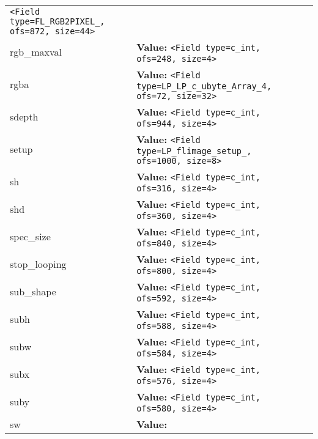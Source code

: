 \begin{longtable}{|p{\varnamewidth}|p{\vardescrwidth}|l}
{\tt {\textless}Field type=FL\_RGB2PIXEL\_, ofs=872, size=44{\textgreater}}&\\
\cline{1-2}
\raggedright r\-g\-b\-\_\-m\-a\-x\-v\-a\-l\- & \raggedright \textbf{Value:} 
{\tt {\textless}Field type=c\_int, ofs=248, size=4{\textgreater}}&\\
\cline{1-2}
\raggedright r\-g\-b\-a\- & \raggedright \textbf{Value:} 
{\tt {\textless}Field type=LP\_LP\_c\_ubyte\_Array\_4, ofs=72, size=32{\textgreater}}&\\
\cline{1-2}
\raggedright s\-d\-e\-p\-t\-h\- & \raggedright \textbf{Value:} 
{\tt {\textless}Field type=c\_int, ofs=944, size=4{\textgreater}}&\\
\cline{1-2}
\raggedright s\-e\-t\-u\-p\- & \raggedright \textbf{Value:} 
{\tt {\textless}Field type=LP\_flimage\_setup\_, ofs=1000, size=8{\textgreater}}&\\
\cline{1-2}
\raggedright s\-h\- & \raggedright \textbf{Value:} 
{\tt {\textless}Field type=c\_int, ofs=316, size=4{\textgreater}}&\\
\cline{1-2}
\raggedright s\-h\-d\- & \raggedright \textbf{Value:} 
{\tt {\textless}Field type=c\_int, ofs=360, size=4{\textgreater}}&\\
\cline{1-2}
\raggedright s\-p\-e\-c\-\_\-s\-i\-z\-e\- & \raggedright \textbf{Value:} 
{\tt {\textless}Field type=c\_int, ofs=840, size=4{\textgreater}}&\\
\cline{1-2}
\raggedright s\-t\-o\-p\-\_\-l\-o\-o\-p\-i\-n\-g\- & \raggedright \textbf{Value:} 
{\tt {\textless}Field type=c\_int, ofs=800, size=4{\textgreater}}&\\
\cline{1-2}
\raggedright s\-u\-b\-\_\-s\-h\-a\-p\-e\- & \raggedright \textbf{Value:} 
{\tt {\textless}Field type=c\_int, ofs=592, size=4{\textgreater}}&\\
\cline{1-2}
\raggedright s\-u\-b\-h\- & \raggedright \textbf{Value:} 
{\tt {\textless}Field type=c\_int, ofs=588, size=4{\textgreater}}&\\
\cline{1-2}
\raggedright s\-u\-b\-w\- & \raggedright \textbf{Value:} 
{\tt {\textless}Field type=c\_int, ofs=584, size=4{\textgreater}}&\\
\cline{1-2}
\raggedright s\-u\-b\-x\- & \raggedright \textbf{Value:} 
{\tt {\textless}Field type=c\_int, ofs=576, size=4{\textgreater}}&\\
\cline{1-2}
\raggedright s\-u\-b\-y\- & \raggedright \textbf{Value:} 
{\tt {\textless}Field type=c\_int, ofs=580, size=4{\textgreater}}&\\
\cline{1-2}
\raggedright s\-w\- & \raggedright \textbf{Value:} 

\end{longtable}
